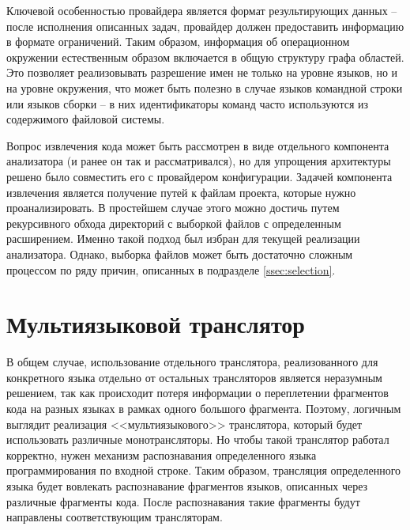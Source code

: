 Ключевой особенностью провайдера является формат результирующих данных -- после исполнения описанных задач, провайдер
должен предоставить информацию в формате ограничений. Таким образом, информация об операционном окружении
естественным образом включается в общую структуру графа областей. Это позволяет реализовывать разрешение имен
не только на уровне языков, но и на уровне окружения, что может быть полезно в случае языков командной строки
или языков сборки -- в них идентификаторы команд часто используются из содержимого файловой системы.

Вопрос извлечения кода может быть рассмотрен в виде отдельного компонента анализатора (и ранее он так и
рассматривался), но для упрощения архитектуры решено было совместить его с провайдером конфигурации.
Задачей компонента извлечения является получение путей к файлам проекта, которые нужно проанализировать.
В простейшем случае этого можно достичь путем рекурсивного обхода директорий с выборкой файлов с определенным
расширением. Именно такой подход был избран для текущей реализации анализатора. Однако, выборка
файлов может быть достаточно сложным процессом по ряду причин, описанных в подразделе \ref{ssec:selection}.

\section{Мультиязыковой транслятор}

В общем случае, использование отдельного транслятора, реализованного для конкретного языка отдельно
от остальных трансляторов является неразумным решением, так как происходит потеря информации о переплетении
фрагментов кода на разных языках в рамках одного большого фрагмента. Поэтому, логичным выглядит реализация
<<мультиязыкового>> транслятора, который будет использовать различные монотрансляторы. Но чтобы такой
транслятор работал корректно, нужен механизм 
распознавания определенного языка программирования по входной строке. Таким образом,
трансляция определенного языка будет вовлекать распознавание фрагментов языков, описанных через различные фрагменты кода.
После распознавания такие фрагменты будут направлены соответствующим трансляторам.

